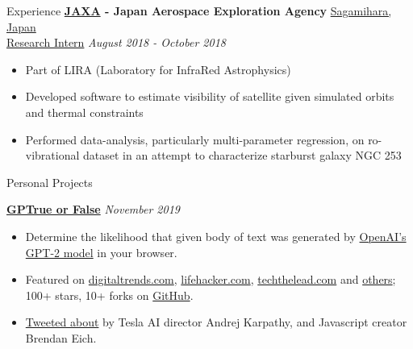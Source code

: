 \documentclass{resume} %
\begin{document}
\begin{rSection}{Experience}
	{\bf \href{https://global.jaxa.jp/}{JAXA} -  Japan Aerospace Exploration Agency} \hfill \underline{Sagamihara, Japan}
	\\ \underline{Research Intern} \hfill {\em August 2018 - October 2018}
	\begin{itemize}\vspace{-0.5em}
		\item Part of LIRA (Laboratory for InfraRed Astrophysics)
		\item Developed software to estimate visibility of satellite given simulated orbits and thermal constraints
		\item Performed data-analysis, particularly multi-parameter regression, on ro-vibrational dataset in an attempt to characterize starburst galaxy NGC 253
	\end{itemize}
\end{rSection}

\begin{rSection}{Personal Projects}

	{\bf \href{https://chrome.google.com/webstore/search/Gptrue%20or%20false}{GPTrue or False}}  \hfill {\em November 2019}
	\begin{itemize}\vspace{-0.5em}
		\item Determine the likelihood that given body of text was generated by \href{https://openai.com/blog/better-language-models/}{OpenAI's GPT-2 model} in your browser.
		\item Featured on \href{https://www.digitaltrends.com/cool-tech/gpt-2-plugin-sorts-real-from-fake/}{digitaltrends.com}, \href{https://lifehacker.com/automatically-detect-computer-generated-text-with-this-1839942470}{lifehacker.com}, \href{https://techthelead.com/chrome-extension-tells-you-who-wrote-that-text-computer-or-human/}{techthelead.com} and \href{https://news.google.com/search?q=gptrue+or+false&hl=en-US&gl=US&ceid=US:en}{others}; 100+ stars, 10+ forks on \href{https://github.com/thesofakillers/GPTrue-or-False}{GitHub}.
		\item \href{https://twitter.com/BrendanEich/status/1196507724072095744?s=20}{Tweeted about} by Tesla AI director Andrej Karpathy, and Javascript creator Brendan Eich.
	\end{itemize}
\end{rSection}
\end{document}
